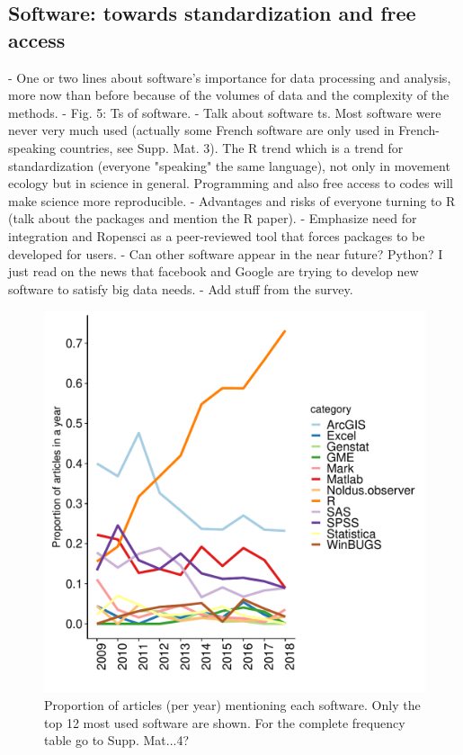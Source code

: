 \documentclass[9pt,twocolumn,twoside,lineno]{pnas-new}
\begin{document}
\subsection*{Software: towards standardization and free access}

- One or two lines about software's importance for data processing and analysis, more now than before because of the volumes of data and the complexity of the methods. 
- Fig. 5: Ts of software. 
- Talk about software ts. Most software were never very much used (actually some French software are only used in French-speaking countries, see Supp. Mat. 3). The R trend which is a trend for standardization (everyone "speaking" the same language), not only in movement ecology but in science in general. Programming and also free access to codes will make science more reproducible. 
- Advantages and risks of everyone turning to R (talk about the packages and mention the R paper). 
- Emphasize need for integration and Ropensci as a peer-reviewed tool that forces packages to be developed for users. 
- Can other software appear in the near future? Python? I just read on the news that facebook and Google are trying to develop new software to satisfy big data needs.
- Add stuff from the survey.

\begin{figure}%
\centering
\includegraphics[width=.8\linewidth]{./img/software_ts.pdf}
\caption{Proportion of articles (per year) mentioning each software. Only the top 12 most used software are shown. For the complete frequency table go to Supp. Mat...4?}
\label{fig:software}
\end{figure}
\end{document}
